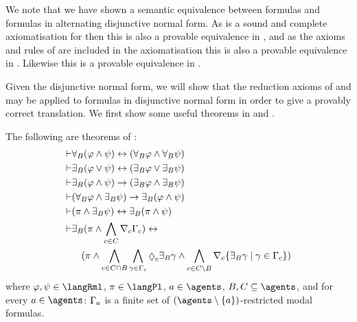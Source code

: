 We note that we have shown a semantic equivalence between \langMl{} formulas and formulas in alternating disjunctive normal form.
As \axiomKFF{} is a sound and complete axiomatisation for \logicKFF{} then this is also a provable equivalence in \axiomKFF{}, and as the axioms and rules of \axiomKFF{} are included in the axiomatisation \axiomRmlKFF{} this is also a provable equivalence in \axiomRmlKFF{}.
Likewise this is a provable equivalence in \axiomRmlKD{}.

Given the disjunctive normal form, we will show that the reduction axioms of \axiomRmlKFF{} and \axiomRmlKD{} may be applied to formulas in disjunctive normal form in order to give a provably correct translation.
We first show some useful theorems in \axiomRmlKFF{} and \axiomRmlKD{}.

\begin{lemma}\label{rml-kff-theorems}
The following are theorems of \axiomRmlKFF{}:
\begin{align}
    \proves & \allrefsBs (\phi \land \psi) \iff (\allrefsBs \phi \land \allrefsBs \psi) \label{rml-kff-and}\\
    \proves & \somerefsBs (\phi \lor \psi) \iff (\somerefsBs \phi \lor \somerefsBs \psi) \label{rml-kff-or}\\
    \proves & \somerefsBs (\phi \land \psi) \implies (\somerefsBs \phi \land \somerefsBs \psi) \label{rml-kff-d-and}\\
    \proves & (\allrefsBs \phi \land \somerefsBs \psi) \implies \somerefsBs (\phi \land \psi) \label{rml-kff-db-and}\\
    \proves & (\pi \land \somerefsBs \psi) \iff \somerefsBs (\pi \land \psi) \label{rml-kff-pd-and}\\
    \proves & \displaystyle \somerefsBs (\pi \land \bigwedge_{\agentC \in \agentsC} \coverC \Gamma_\agentC) \iff \nonumber\\
            & \displaystyle \quad
            (
            \pi \land
            \bigwedge_{\agentC \in \agentsC \cap \agentsB} \bigwedge_{\gamma \in \Gamma_\agentC} \possibleC \somerefsBs \gamma \land
            \bigwedge_{\agentC \in \agentsC \setminus \agentsB} \coversC \{\somerefsBs \gamma \mid \gamma \in \Gamma_\agentC\} 
            ) \label{rml-kff-cover}
\end{align}
where $\phi, \psi \in \langRml$, $\pi \in \langPl$, $\agentA \in \agents$, $\agentsB, \agentsC \subseteq \agents$, and for every $\agentA \in \agents$: $\Gamma_a$ is a finite set of $(\agents \setminus \{\agentA\})$-restricted modal formulas.
\end{lemma}

